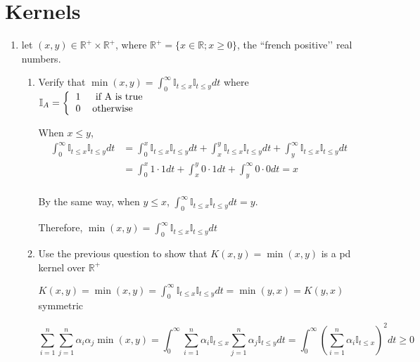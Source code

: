 \documentclass[11pt]{article}
\begin{document}



\section{Kernels}

\begin{enumerate}
\item let $(x,y) \in \mathbb{R}^+ \times \mathbb{R}^+$, where $\mathbb{R}^+=\{x \in \mathbb{R};x \geq 0\}$, the ``french positive\rq\rq{} real numbers. 

\begin{enumerate}
\item  Verify that $\min(x,y) = \int_0^\infty \mathbb{I}_{t\leq x} \mathbb{I}_{t\leq y} dt$
where  $\mathbb{I}_A =  \left\{
\begin{tabular}{ll}
1 & \mbox{ if A is true}\\
0 & \mbox{otherwise}
\end{tabular}\right.$

When $x\le y$,
\begin{align*}
\int_0^\infty \mathbb{I}_{t\leq x} \mathbb{I}_{t\leq y} dt&=\int_0^x \mathbb{I}_{t\leq x} \mathbb{I}_{t\leq y} dt+\int_x^y \mathbb{I}_{t\leq x} \mathbb{I}_{t\leq y} dt+\int_y^\infty \mathbb{I}_{t\leq x} \mathbb{I}_{t\leq y} dt\\
&=\int_0^x 1\cdot 1 dt+\int_x^y 0\cdot 1 dt+\int_y^\infty 0\cdot 0 dt=x\\
\end{align*}

By the same way, when $y\le x$, $\int_0^\infty \mathbb{I}_{t\leq x} \mathbb{I}_{t\leq y} dt=y$.

Therefore, $\min(x,y) = \int_0^\infty \mathbb{I}_{t\leq x} \mathbb{I}_{t\leq y} dt$
\vspace{2mm}
\item Use the previous question to show that $K(x,y)=\min(x,y)$ is a pd kernel over $\mathbb{R}^+$


\vspace{2mm}
$K(x,y)=\min(x,y)=\int_0^\infty \mathbb{I}_{t\leq x} \mathbb{I}_{t\leq y} dt=\min(y,x)=K(y,x)$ symmetric

$$\sum_{i=1}^n\sum_{j=1}^n\alpha_i\alpha_j\min(x,y)=\int_0^\infty \sum_{i=1}^n\alpha_i\mathbb{I}_{t\leq x} \sum_{j=1}^n\alpha_j\mathbb{I}_{t\leq y} dt=\int_0^\infty (\sum_{i=1}^n\alpha_i\mathbb{I}_{t\leq x})^2dt\ge0$$




\end{enumerate}
\end{enumerate}
\end{document}
